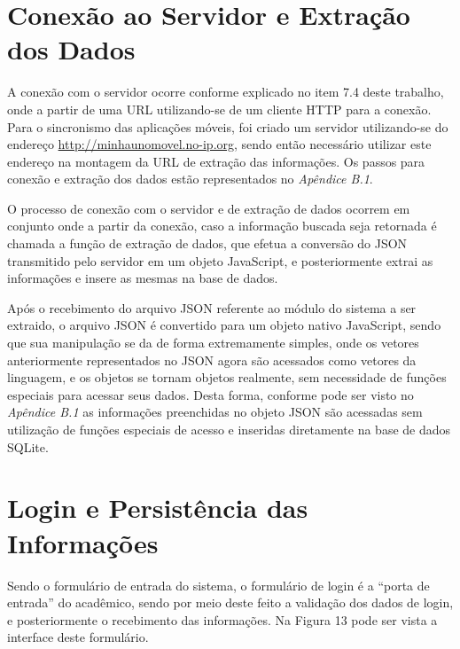 \section{Conexão ao Servidor e Extração dos Dados}
A conexão com o servidor ocorre conforme explicado no item 7.4 deste trabalho, onde a partir de uma URL utilizando-se de um cliente HTTP para a conexão. Para o sincronismo das aplicações móveis, foi criado um servidor utilizando-se do endereço \url{http://minhaunomovel.no-ip.org}, sendo então necessário utilizar este endereço na montagem da URL de extração das informações. Os passos para conexão e extração dos dados estão representados no \emph{Apêndice B.1}.

O processo de conexão com o servidor e de extração de dados ocorrem em conjunto onde a partir da conexão, caso a informação buscada seja retornada é chamada a função de extração de dados, que efetua a conversão do JSON transmitido pelo servidor em um objeto JavaScript, e posteriormente extrai as informações e insere as mesmas na base de dados. 

Após o recebimento do arquivo JSON referente ao módulo do sistema a ser extraido, o arquivo JSON é convertido para um objeto nativo JavaScript, sendo que sua manipulação se da de forma extremamente simples, onde os vetores anteriormente representados no JSON agora são acessados como vetores da linguagem, e os objetos se tornam objetos realmente, sem necessidade de funções especiais para acessar seus dados. Desta forma, conforme pode ser visto no \emph{Apêndice B.1} as informações preenchidas no objeto JSON são acessadas sem utilização de funções especiais de acesso e inseridas diretamente na base de dados SQLite.

\section{Login e Persistência das Informações}
Sendo o formulário de entrada do sistema, o formulário de login é a ``porta de entrada'' do acadêmico, sendo por meio deste feito a validação dos dados de login, e posteriormente o recebimento das informações. Na Figura 13 pode ser vista a interface deste formulário.

